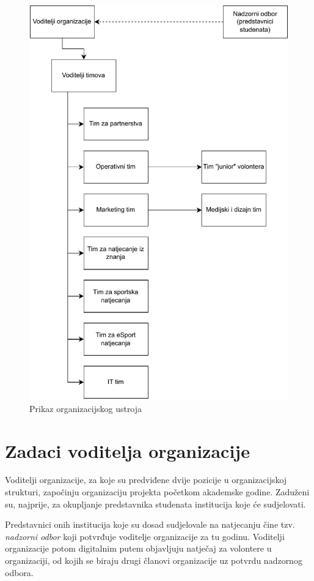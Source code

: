 \documentclass[times, utf8, diplomski]{fer}
\begin{document}
\begin{figure}[H]
\includegraphics{slike/hijerarhija.pdf}
\caption{Prikaz organizacijskog ustroja}
\label{fig:hier}
\end{figure}

\section{Zadaci voditelja organizacije}
Voditelji organizacije, za koje su predviđene dvije pozicije u organizacijskoj
strukturi, započinju organizaciju projekta početkom akademske godine. Zaduženi
su, najprije, za okupljanje predstavnika studenata institucija koje će
sudjelovati.

Predstavnici onih institucija koje su dosad sudjelovale na natjecanju čine tzv.
\emph{nadzorni odbor} koji potvrđuje voditelje organizacije za tu godinu.
Voditelji organizacije potom digitalnim putem objavljuju natječaj za volontere u
organizaciji, od kojih se biraju drugi članovi organizacije uz potvrdu nadzornog
odbora.
\end{document}

